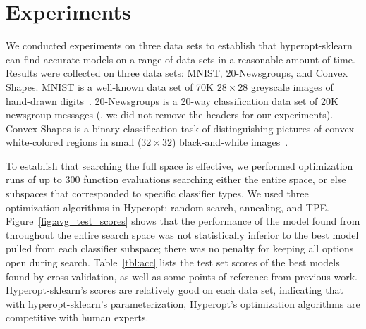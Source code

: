 \documentclass[wcp]{jmlr}
\begin{document}
\section{Experiments}
We conducted experiments on three data sets to establish that hyperopt-sklearn can find accurate models on a range of data sets in a reasonable amount of time.
Results were collected on three data sets: MNIST, 20-Newsgroups, and Convex Shapes.
MNIST is a well-known data set of 70K $28\times 28$ greyscale images of hand-drawn digits~\citep{lecun+bottou+bengio+haffner:1998}.
20-Newsgroups is a 20-way classification data set of 20K newsgroup messages (\citet{20newsgroups}, we did not remove the headers for our experiments).
Convex Shapes is a binary classification task of distinguishing pictures of convex white-colored regions in small ($32\times 32$) black-and-white images~\citep{larochelle+etal:2007}.

To establish that searching the full space is effective,
we performed optimization runs of up to 300 function evaluations searching either the entire space, or else subspaces that corresponded to specific classifier types.
We used three optimization algorithms in Hyperopt: random search, annealing, and TPE.
Figure~\ref{fig:avg_test_scores} shows that the performance of the model found from throughout the entire search space was not statistically inferior to the best model pulled from each classifier subspace;
there was no penalty for keeping all options open during search.
Table~\ref{tbl:acc} lists the test set scores of the best models found by cross-validation, as well as some points of reference from previous work.
Hyperopt-sklearn's scores are relatively good on each data set, indicating that with hyperopt-sklearn's parameterization, Hyperopt's optimization algorithms are competitive with human experts.
\end{document}
